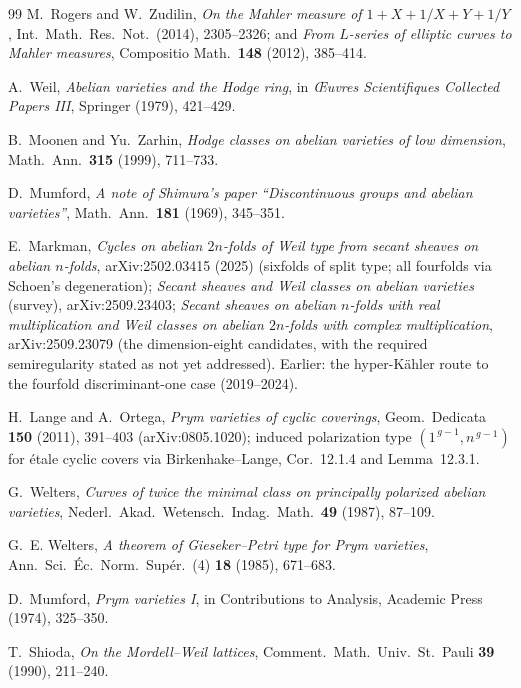 \documentclass[11pt]{article}
\theoremstyle{definition}
\theoremstyle{remark}
\begin{document}
\begin{thebibliography}{99}
 M.~Rogers and W.~Zudilin, \emph{On the Mahler measure
of $1+X+1/X+Y+1/Y$}, Int.\ Math.\ Res.\ Not.\ (2014), 2305--2326; and
\emph{From $L$-series of elliptic curves to Mahler measures}, Compositio
Math.\ \textbf{148} (2012), 385--414.

 A.~Weil, \emph{Abelian varieties and the Hodge ring}, in
\emph{\OE uvres Scientifiques Collected Papers III}, Springer (1979),
421--429.

 B.~Moonen and Yu.~Zarhin, \emph{Hodge classes on
abelian varieties of low dimension}, Math.\ Ann.\ \textbf{315} (1999),
711--733.

 D.~Mumford, \emph{A note of Shimura's paper
``Discontinuous groups and abelian varieties''}, Math.\ Ann.\ \textbf{181}
(1969), 345--351.

 E.~Markman, \emph{Cycles on abelian $2n$-folds of Weil
type from secant sheaves on abelian $n$-folds}, arXiv:2502.03415 (2025)
(sixfolds of split type; all fourfolds via Schoen's degeneration);
\emph{Secant sheaves and Weil classes on abelian varieties} (survey),
arXiv:2509.23403; \emph{Secant sheaves on abelian $n$-folds with real
multiplication and Weil classes on abelian $2n$-folds with complex
multiplication}, arXiv:2509.23079 (the dimension-eight candidates, with
the required semiregularity stated as not yet addressed). Earlier: the
hyper-K\"ahler route to the fourfold discriminant-one case (2019--2024).

 H.~Lange and A.~Ortega, \emph{Prym varieties of
cyclic coverings}, Geom.\ Dedicata \textbf{150} (2011), 391--403
(arXiv:0805.1020); induced polarization type $(1^{\,g-1},n^{\,g-1})$ for
\'etale cyclic covers via Birkenhake--Lange, Cor.~12.1.4 and
Lemma~12.3.1.

 G.~Welters, \emph{Curves of twice the minimal class on
principally polarized abelian varieties}, Nederl.\ Akad.\ Wetensch.\ Indag.\
Math.\ \textbf{49} (1987), 87--109.

 G.~E. Welters, \emph{A theorem of Gieseker--Petri type
for Prym varieties}, Ann.\ Sci.\ \'Ec.\ Norm.\ Sup\'er.\ (4) \textbf{18}
(1985), 671--683.

 D.~Mumford, \emph{Prym varieties I}, in
Contributions to Analysis, Academic Press (1974), 325--350.

 T.~Shioda, \emph{On the Mordell--Weil lattices},
Comment.\ Math.\ Univ.\ St.\ Pauli \textbf{39} (1990), 211--240.


\end{thebibliography}
\end{document}
